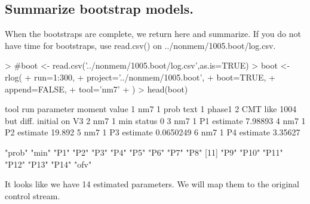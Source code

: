 \subsection{Summarize bootstrap models.}
When the bootstraps are complete, we return here and summarize. If you 
do not have time for bootstraps, use read.csv() on ../nonmem/1005.boot/log.csv.
\begin{Schunk}
\begin{Sinput}
> #boot <- read.csv('../nonmem/1005.boot/log.csv',as.is=TRUE) 
> boot <- rlog(
+ 	run=1:300,
+ 	project='../nonmem/1005.boot',
+ 	boot=TRUE,
+ 	append=FALSE,
+ 	tool='nm7'
+ )
> head(boot)
\end{Sinput}
\begin{Soutput}
  tool run parameter   moment                                            value
1  nm7   1      prob     text 1 phase1 2 CMT like 1004 but diff. initial on V3
2  nm7   1       min   status                                                0
3  nm7   1        P1 estimate                                          7.98893
4  nm7   1        P2 estimate                                           19.892
5  nm7   1        P3 estimate                                        0.0650249
6  nm7   1        P4 estimate                                          3.35627
\end{Soutput}
\begin{Soutput}
 [1] "prob" "min"  "P1"   "P2"   "P3"   "P4"   "P5"   "P6"   "P7"   "P8"  
[11] "P9"   "P10"  "P11"  "P12"  "P13"  "P14"  "ofv" 
\end{Soutput}
\end{Schunk}
It looks like we have 14 estimated parameters.  We will map them to the
original control stream.
